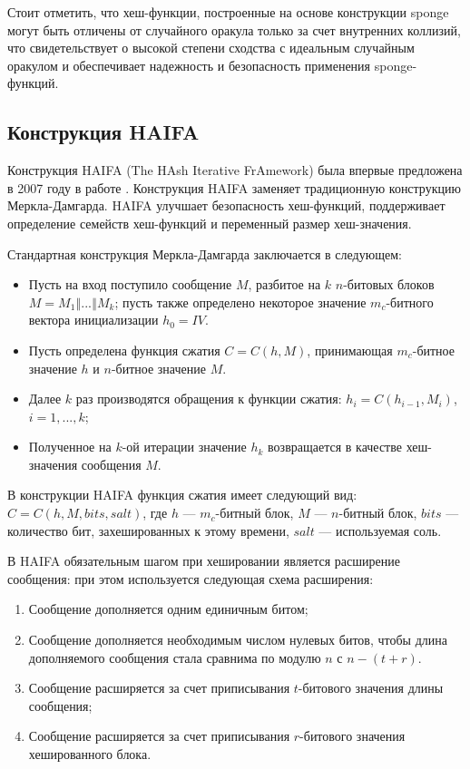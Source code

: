 \documentclass{./civarticle}
\begin{document}
Стоит отметить, что хеш-функции, построенные на основе конструкции sponge могут быть отличены от случайного оракула только за счет внутренних коллизий, что свидетельствует о высокой степени сходства с идеальным случайным оракулом и обеспечивает надежность и безопасность применения sponge-функций.


\subsection{Конструкция HAIFA}

Конструкция HAIFA (The HAsh Iterative FrAmework) была впервые предложена в 2007 году в работе \cite{haifa}. Конструкция HAIFA заменяет традиционную конструкцию Меркла-Дамгарда. HAIFA улучшает безопасность хеш-функций, поддерживает определение семейств хеш-функций и переменный размер хеш-значения.

Стандартная конструкция Меркла-Дамгарда заключается в следующем:

\begin{itemize}
    \item Пусть на вход поступило сообщение $M$, разбитое на $k$ $n$-битовых блоков $M = M_1 \mathbin\Vert ... \mathbin\Vert M_k$; пусть также определено некоторое значение $m_c$-битного вектора инициализации $h_0 = IV$.
    \item Пусть определена функция сжатия $C = C(h, M)$, принимающая $m_c$-битное значение $h$ и $n$-битное значение $M$.
    \item Далее $k$ раз производятся обращения к функции сжатия: $h_i = C(h_{i-1}, M_i)$, $i = 1, ..., k$;
    \item Полученное на $k$-ой итерации значение $h_k$ возвращается в качестве хеш-значения сообщения $M$.
\end{itemize}

В конструкции HAIFA функция сжатия имеет следующий вид: $C = C(h, M, bits, salt)$, где $h$ --- $m_c$-битный блок, $M$ --- $n$-битный блок, $bits$ --- количество бит, захешированных к этому времени, $salt$ --- используемая соль.

В HAIFA обязательным шагом при хешировании является расширение сообщения: при этом используется следующая схема расширения:

\begin{enumerate}
    \item Сообщение дополняется одним единичным битом;
    \item Сообщение дополняется необходимым числом нулевых битов, чтобы длина дополняемого сообщения стала сравнима по модулю $n$ с $n - (t + r)$.
    \item Сообщение расширяется за счет приписывания $t$-битового значения длины сообщения;
    \item Сообщение расширяется за счет приписывания $r$-битового значения хешированного блока.
\end{enumerate}
\end{document}
